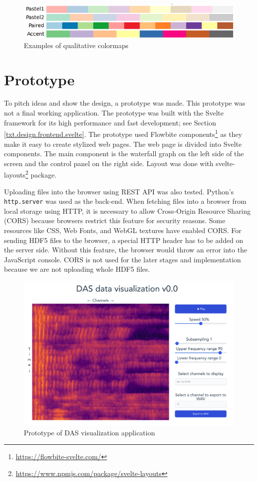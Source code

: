 \begin{figure}[h!]
    \centering
    \includegraphics[width=.7\linewidth]{obrazky/qualitative.png}
    \caption{Examples of qualitative colormaps\cite{colormap}}
    \label{fig:colormap.qua}
\end{figure}



\section{Prototype}\label{txt.design.frontend.prototype}

To pitch ideas and show the design, a prototype was made. This prototype was not a final working application. The prototype was built with the Svelte framework for its high performance and fast development; see Section \ref{txt.design.frontend.svelte}. The prototype used Flowbite components\footnote{\url{https://flowbite-svelte.com/}} as they make it easy to create stylized web pages. The web page is divided into Svelte components. The main component is the waterfall graph on the left side of the screen and the control panel on the right side. Layout was done with svelte-layouts\footnote{\url{https://www.npmjs.com/package/svelte-layouts}} package. 

Uploading files into the browser using REST API was also tested. Python's \verb|http.server| was used as the back-end. When fetching files into a browser from local storage using HTTP, it is necessary to allow Cross-Origin Resource Sharing (CORS) because browsers restrict this feature for security reasons. Some resources like CSS, Web Fonts, and WebGL textures have enabled CORS. For sending HDF5 files to the browser, a special HTTP header has to be added on the server side. Without this feature, the browser would throw an error into the JavaScript console. CORS is not used for the later stages and implementation because we are not uploading whole HDF5 files.

\begin{figure}[h]
    \centering
    \includegraphics[width=\linewidth]{obrazky/svelte_prototype.png}
    \caption{Prototype of DAS visualization application}
    \label{fig:prototypesvelte}
\end{figure}
